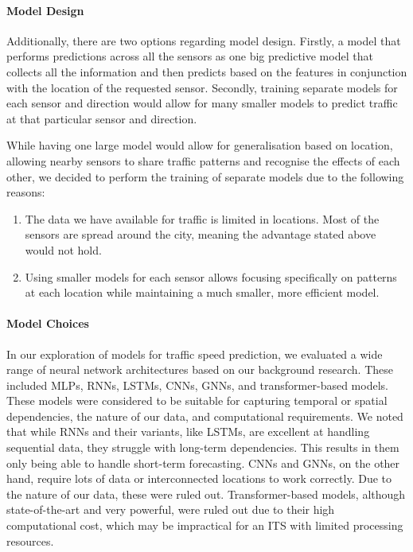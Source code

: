 \paragraph{Model Design}
Additionally, there are two options regarding model design. Firstly, a model that performs predictions across all the sensors as one big predictive model that collects all the information and then predicts based on the features in conjunction with the location of the requested sensor. Secondly, training separate models for each sensor and direction would allow for many smaller models to predict traffic at that particular sensor and direction.

While having one large model would allow for generalisation based on location, allowing nearby sensors to share traffic patterns and recognise the effects of each other, we decided to perform the training of separate models due to the following reasons:
\begin{enumerate}
    \item The data we have available for traffic is limited in locations. Most of the sensors are spread around the city, meaning the advantage stated above would not hold.
    \item Using smaller models for each sensor allows focusing specifically on patterns at each location while maintaining a much smaller, more efficient model.
\end{enumerate}

\paragraph{Model Choices}
\label{link:model-choices}
In our exploration of models for traffic speed prediction, we evaluated a wide range of neural network architectures based on our background research. These included MLPs, RNNs, LSTMs, CNNs, GNNs, and transformer-based models. These models were considered to be suitable for capturing temporal or spatial dependencies, the nature of our data, and computational requirements. We noted that while RNNs and their variants, like LSTMs, are excellent at handling sequential data, they struggle with long-term dependencies. This results in them only being able to handle short-term forecasting. CNNs and GNNs, on the other hand, require lots of data or interconnected locations to work correctly. Due to the nature of our data, these were ruled out. Transformer-based models, although state-of-the-art and very powerful, were ruled out due to their high computational cost, which may be impractical for an ITS with limited processing resources.

